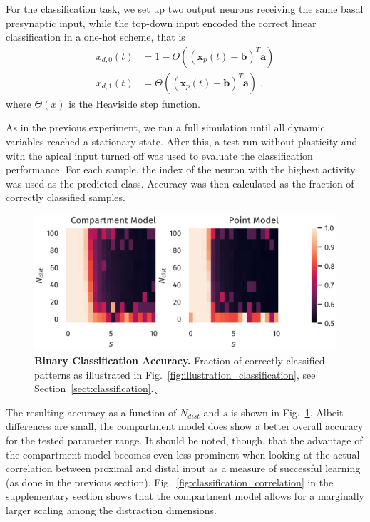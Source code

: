 \documentclass[utf8]{frontiersSCNS} %
\begin{document}
For the classification task, we set up two output neurons receiving
the same basal presynaptic input, while the top-down input encoded
the correct linear classification in a one-hot scheme, that is
\begin{align}
x_{d,0}(t) &= 1 - \Theta\left( \left(\mathbf{x}_p(t) - 
\mathbf{b}\right)^T \mathbf{a}\right) \\
x_{d,1}(t) &= \Theta\left( \left(\mathbf{x}_p(t) - 
\mathbf{b}\right)^T \mathbf{a}\right) \; ,
\end{align}
where $\Theta(x)$ is the Heaviside step function.

As in the previous experiment, we ran a full simulation until 
all dynamic variables reached a stationary state. After this,
a test run without plasticity and with the apical input turned off 
was used to evaluate the classification	performance. 
For each sample, the index of the neuron with the highest 
activity was used as the predicted class. 
Accuracy was then calculated as the fraction
of correctly classified samples.
\begin{figure}
\centering
\includegraphics[width=0.7\columnwidth]{classification_dimension_scaling_high_input_dim}
\caption{{\bf Binary Classification Accuracy.}
	Fraction of correctly classified patterns as illustrated in
	Fig.~\ref{fig:illustration_classification}, see 
	Section~\ref{sect:classification}.¸}
\label{fig:classification_accuracy}
\end{figure}

The resulting accuracy as a function of $N_{dist}$ and $s$
is shown in Fig.~\ref{fig:classification_accuracy}.
Albeit differences are small, the compartment model does
show a better overall accuracy for the tested parameter range.
It should be noted, though, that the advantage of the compartment
model becomes even less prominent when looking at the actual
correlation between proximal and distal input as a
measure of successful learning (as done in the previous section).
Fig.~\ref{fig:classification_correlation} in the supplementary 
section shows that the compartment model allows for a marginally
larger scaling among the distraction dimensions.
\\
\end{document}
